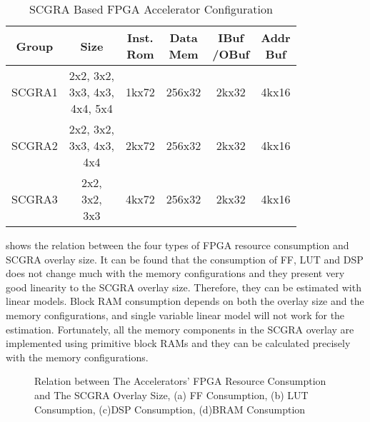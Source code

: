\begin{table}[tb]
    \footnotesize
    \centering
    \caption{SCGRA Based FPGA Accelerator Configuration \label{tab:config}}{
        \begin{tabular}{c|c|c|c|c|c}
            \hline
            Group & Size & \tabincell{c}{Inst. \\ Rom} & 
            \tabincell{c}{Data \\ Mem} & \tabincell{c}{IBuf \\ /OBuf} & 
            \tabincell{c}{Addr \\Buf} \\ \hline

            SCGRA1 & \tabincell{l}{2x2, 3x2, \\ 3x3, 4x3, \\ 4x4, 5x4} & 
            1kx72 & 256x32 & 2kx32 & 4kx16\\ \hline

            SCGRA2 & \tabincell{l}{2x2, 3x2, \\ 3x3, 4x3, \\4x4} & 
            2kx72 & 256x32 & 2kx32 & 4kx16\\ \hline

            SCGRA3 & \tabincell{l}{2x2, \\ 3x2, \\ 3x3 } &  
            4kx72 & 256x32 & 2kx32 & 4kx16\\ \hline
        \end{tabular}
    }
\end{table}

 shows the relation between the four types of FPGA resource consumption and SCGRA overlay size. It can be found that the consumption of FF, LUT and DSP does not change much with the memory configurations and they present very good linearity to the SCGRA overlay size. Therefore, they can be estimated with linear models. Block RAM consumption depends on both the overlay size and the memory configurations, and single variable linear model will not work for the estimation. Fortunately, all the memory components in the SCGRA overlay are implemented using primitive block RAMs and they can be calculated precisely with the memory configurations. 

\begin{figure}[tb]
\centering
    \hfill
    \caption{Relation between The Accelerators' FPGA Resource Consumption and The SCGRA Overlay Size, 
    (a) FF Consumption, (b) LUT Consumption, (c)DSP Consumption, (d)BRAM Consumption}
    \label{fig:SCGRA-Overhead}
\end{figure}

